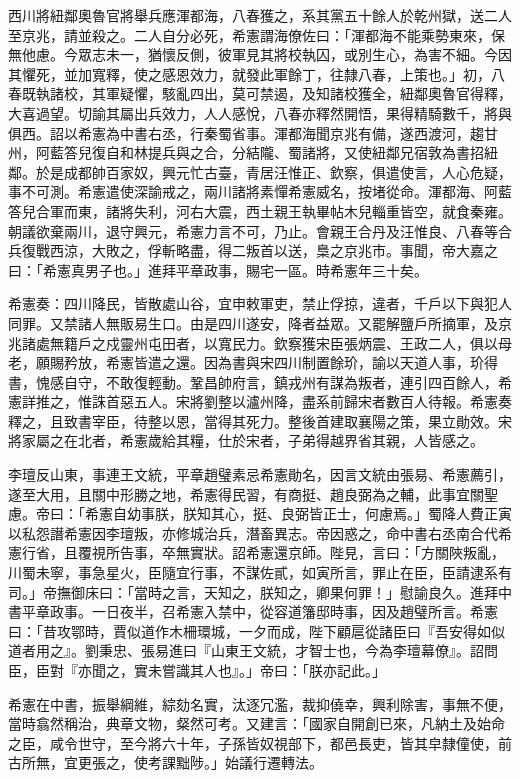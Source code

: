 \begin{pinyinscope}
 西川將紐鄰奧魯官將舉兵應渾都海，八春獲之，系其黨五十餘人於乾州獄，送二人至京兆，請並殺之。二人自分必死，希憲謂海僚佐曰：「渾都海不能乘勢東來，保無他慮。今眾志未一，猶懷反側，彼軍見其將校執囚，或別生心，為害不細。今因其懼死，並加寬釋，使之感恩效力，就發此軍餘丁，往隸八春，上策也。」初，八春既執諸校，其軍疑懼，駭亂四出，莫可禁遏，及知諸校獲全，紐鄰奧魯官得釋，大喜過望。切諭其屬出兵效力，人人感悅，八春亦釋然開悟，果得精騎數千，將與俱西。詔以希憲為中書右丞，行秦蜀省事。渾都海聞京兆有備，遂西渡河，趨甘州，阿藍答兒復自和林提兵與之合，分結隴、蜀諸將，又使紐鄰兄宿敦為書招紐鄰。於是成都帥百家奴，興元忙古臺，青居汪惟正、欽察，俱遣使言，人心危疑，事不可測。希憲遣使深諭戒之，兩川諸將素憚希憲威名，按堵從命。渾都海、阿藍答兒合軍而東，諸將失利，河右大震，西土親王執畢帖木兒輜重皆空，就食秦雍。朝議欲棄兩川，退守興元，希憲力言不可，乃止。會親王合丹及汪惟良、八春等合兵復戰西涼，大敗之，俘斬略盡，得二叛首以送，梟之京兆市。事聞，帝大嘉之曰：「希憲真男子也。」進拜平章政事，賜宅一區。時希憲年三十矣。



 希憲奏：四川降民，皆散處山谷，宜申敕軍吏，禁止俘掠，違者，千戶以下與犯人同罪。又禁諸人無販易生口。由是四川遂安，降者益眾。又罷解鹽戶所摘軍，及京兆諸處無籍戶之戍靈州屯田者，以寬民力。欽察獲宋臣張炳震、王政二人，俱以母老，願賜矜放，希憲皆遣之還。因為書與宋四川制置餘玠，諭以天道人事，玠得書，愧感自守，不敢復輕動。鞏昌帥府言，鎮戎州有謀為叛者，連引四百餘人，希憲詳推之，惟誅首惡五人。宋將劉整以瀘州降，盡系前歸宋者數百人待報。希憲奏釋之，且致書宰臣，待整以恩，當得其死力。整後首建取襄陽之策，果立勛效。宋將家屬之在北者，希憲歲給其糧，仕於宋者，子弟得越界省其親，人皆感之。



 李璮反山東，事連王文統，平章趙璧素忌希憲勛名，因言文統由張易、希憲薦引，遂至大用，且關中形勝之地，希憲得民習，有商挺、趙良弼為之輔，此事宜關聖慮。帝曰：「希憲自幼事朕，朕知其心，挺、良弼皆正士，何慮焉。」蜀降人費正寅以私怨譖希憲因李璮叛，亦修城治兵，潛畜異志。帝因惑之，命中書右丞南合代希憲行省，且覆視所告事，卒無實狀。詔希憲還京師。陛見，言曰：「方關陜叛亂，川蜀未寧，事急星火，臣隨宜行事，不謀佐貳，如寅所言，罪止在臣，臣請逮系有司。」帝撫御床曰：「當時之言，天知之，朕知之，卿果何罪！」慰諭良久。進拜中書平章政事。一日夜半，召希憲入禁中，從容道籓邸時事，因及趙璧所言。希憲曰：「昔攻鄂時，賈似道作木柵環城，一夕而成，陛下顧扈從諸臣曰『吾安得如似道者用之』。劉秉忠、張易進曰『山東王文統，才智士也，今為李璮幕僚』。詔問臣，臣對『亦聞之，實未嘗識其人也』。」帝曰：「朕亦記此。」



 希憲在中書，振舉綱維，綜劾名實，汰逐冗濫，裁抑僥幸，興利除害，事無不便，當時翕然稱治，典章文物，粲然可考。又建言：「國家自開創已來，凡納土及始命之臣，咸令世守，至今將六十年，子孫皆奴視部下，都邑長吏，皆其皁隸僮使，前古所無，宜更張之，使考課黜陟。」始議行遷轉法。




\end{pinyinscope}

